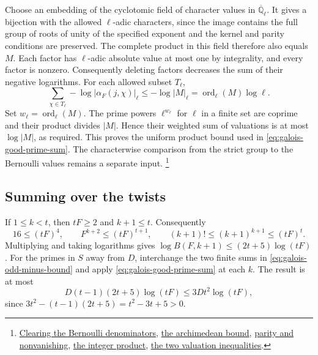 Choose an embedding of the cyclotomic field of character values
in \(\overline{\mathbb Q}_\ell\). It gives a bijection with the
allowed \(\ell\)-adic characters, since the image contains the full
group of roots of unity of the specified exponent and the kernel and
parity conditions are preserved. The complete product in this field
therefore also equals \(M\). Each factor has \(\ell\)-adic absolute
value at most one by integrality, and every factor is nonzero.
Consequently deleting factors decreases the sum of their negative
logarithms. For each allowed subset \(T_\ell\),
\[
 \sum_{\chi\in T_\ell}-\log|\alpha_F(j,\chi)|_\ell
       \le -\log |M|_\ell
       = \operatorname{ord}_\ell(M)\log\ell .
\]
Set \(w_\ell=\operatorname{ord}_\ell(M)\). The prime powers
\(\ell^{w_\ell}\) for \(\ell\) in a finite set are coprime and their
product divides \(|M|\). Hence their weighted sum of valuations is
at most \(\log|M|\), as required. This proves the uniform product
bound used in \eqref{eq:galois-good-prime-sum}. The characterwise
comparison from the strict group to the Bernoulli values remains
a separate input.
\footnote{\href{https://github.com/Deicyde/riemann-hypothesis/blob/40e56bab/src/Development/AutomorphicArithmetic/AutomorphicVarieties/GaloisLibrary/BernoulliNumbers/Denint.lean}{Clearing the Bernoulli denominators},
\href{https://github.com/Deicyde/riemann-hypothesis/blob/40e56bab/src/Development/AutomorphicArithmetic/AutomorphicVarieties/GaloisLibrary/BernoulliNumbers/Denupper.lean}{the archimedean bound},
\href{https://github.com/Deicyde/riemann-hypothesis/blob/40e56bab/src/Development/AutomorphicArithmetic/AutomorphicVarieties/GaloisLibrary/BernoulliNumbers/BNzC.lean}{parity and nonvanishing},
\href{https://github.com/Deicyde/riemann-hypothesis/blob/40e56bab/src/Development/AutomorphicArithmetic/AutomorphicVarieties/GaloisLibrary/BernoulliNumbers/Prodint.lean}{the integer product},
\href{https://github.com/Deicyde/riemann-hypothesis/blob/40e56bab/src/Development/AutomorphicArithmetic/AutomorphicVarieties/OddResidueBounds/ProdVal.lean}{the two valuation inequalities}.}

\subsection{Summing over the twists}

If \(1\le k<t\), then \(tF\ge2\) and \(k+1\le t\). Consequently
\[
  16\le(tF)^4,\qquad F^{k+2}\le(tF)^{t+1},\qquad
  (k+1)!\le(k+1)^{k+1}\le(tF)^t.
\]
Multiplying and taking logarithms gives
\(\log B(F,k+1)\le(2t+5)\log(tF)\). For the primes in \(S\) away
from \(D\), interchange the two finite sums in
\eqref{eq:galois-odd-minus-bound} and apply
\eqref{eq:galois-good-prime-sum} at each \(k\). The result is at most
\[
     D(t-1)(2t+5)\log(tF)\le 3Dt^2\log(tF),
\]
since \(3t^2-(t-1)(2t+5)=t^2-3t+5>0\).

